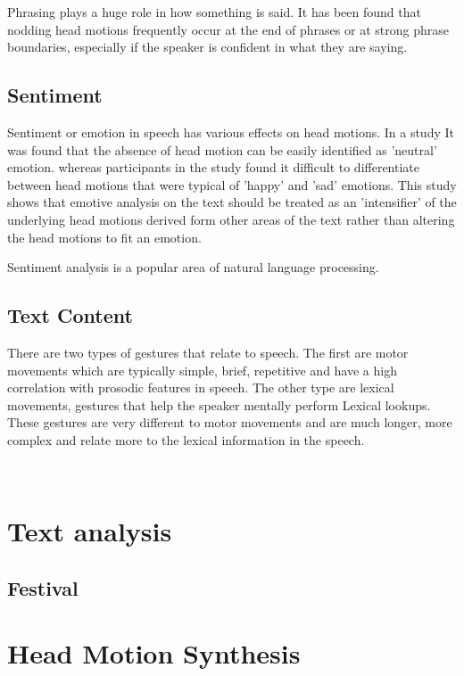 \documentclass[bsc,frontabs,twoside,singlespacing,parskip]{infthesis}
\begin{document}
Phrasing plays a huge role in how something is said. It has been found that nodding head motions frequently occur at the end of phrases or at strong phrase boundaries, especially if the speaker is confident in what they are saying. \cite{ishi2008}  

\subsection{Sentiment}

Sentiment or emotion in speech has various effects on head motions. In a study It was found that the absence of head motion can be easily identified as 'neutral' emotion. \cite{emotion_head_motion} whereas participants in the study found it difficult to differentiate between head motions that were typical of 'happy' and 'sad' emotions. This study shows that emotive analysis on the text should be treated as an 'intensifier' of the underlying head motions derived form other areas of the text rather than altering the head motions to fit an emotion.

Sentiment analysis is a popular area of natural language processing.

\subsection{Text Content}

There are two types of gestures that relate to speech. \cite{lexical_gestures} The first are motor movements which are typically simple, brief, repetitive and have a high correlation with prosodic features in speech. The other type are lexical movements, gestures that help the speaker mentally perform Lexical lookups. These gestures are very different to motor movements and are much longer, more complex and relate more to the lexical information in the speech.

\cite{kendon} \\

\section{Text analysis}
\subsection{Festival}

\section{Head Motion Synthesis}
\end{document}
